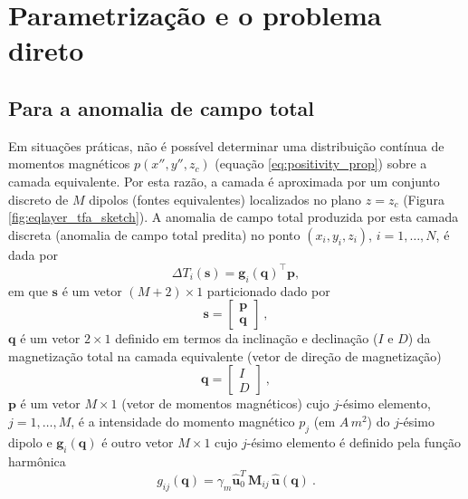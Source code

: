 \section{Parametrização e o problema direto}
\label{sec:par_prob_dir}

\subsection{Para a anomalia de campo total}
\label{subsec:tf_prob_dir}

Em situações práticas, não é possível determinar uma distribuição contínua de momentos magnéticos 
$p(x'',y'',z_{c})$ (equação \ref{eq:positivity_prop}) sobre a camada equivalente. Por esta razão, a 
camada é aproximada por um conjunto discreto de $M$ dipolos (fontes equivalentes) localizados no plano 
$z = z_{c}$ (Figura \ref{fig:eqlayer_tfa_sketch}). A anomalia de campo total produzida por esta camada 
discreta (anomalia de campo total predita) no ponto $(x_{i},y_{i},z_{i})$, $i=1,\dots,N$, é dada por 
\begin{equation}
\Delta T_{i}(\mathbf{s}) = \mathbf{g}_{i}(\mathbf{q})^{\top} \mathbf{p},
\label{eq:tfa_pred_i}
\end{equation}
em que $\mathbf{s}$ é um vetor $(M + 2) \times 1$ particionado dado por 
\begin{equation}
      \mathbf{s} = \begin{bmatrix}
		\mathbf{p} \\
		\mathbf{q}
	\end{bmatrix} \: ,
	\label{eq:s-vector}
\end{equation}
$\mathbf{q}$ é um vetor $2 \times 1$ definido em termos da inclinação e declinação ($I$ e $D$) 
da magnetização total na camada equivalente (vetor de direção de magnetização)
\begin{equation}
\mathbf{q} = \begin{bmatrix}
I \\ D 
\end{bmatrix} \: ,
\label{eq:q-vector}
\end{equation}
$\mathbf{p}$ é um vetor $M \times 1$ (vetor de momentos magnéticos) cujo $j$-ésimo elemento, $j=1,\dots,M$, 
é a intensidade do momento magnético $p_{j}$ (em $A \, m^{2}$) do $j$-ésimo dipolo e 
$\mathbf{g}_{i} (\mathbf{q})$ é outro vetor $M \times 1$ cujo $j$-ésimo elemento é definido pela função harmônica 
\begin{equation}
g_{ij} (\mathbf{q})  = \gamma_{m} \hat{\mathbf{u}}_{0}^T \, 
\mathbf{M}_{ij} \, \hat{\mathbf{u}}(\mathbf{q}) \: .
\label{eq:g_ij}
\end{equation}

